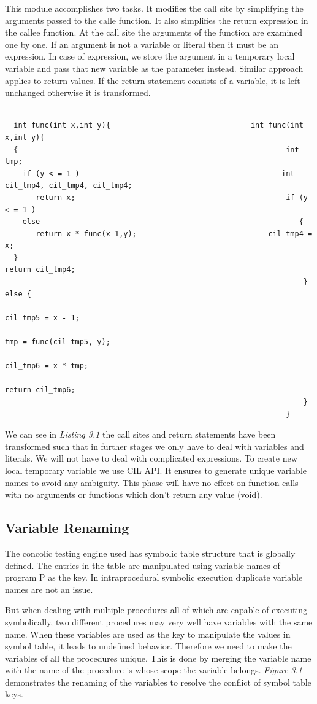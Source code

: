 \documentclass[12pt,oneside]{book}
\begin{document}
This module accomplishes two tasks. It modifies the call site by simplifying the arguments passed to the calle function. It also simplifies the return expression in the callee function. At the call site the arguments of the function are examined one by one. If an argument is not a variable or literal then it must be an expression. In case of expression, we store the argument in a temporary local variable and pass that new variable as the parameter instead. Similar approach applies to return values. If the return statement consists of a variable, it is left unchanged otherwise it is transformed.\\

\begin{lstlisting}[caption=Expressions simplified]

  int func(int x,int y){								int func(int x,int y){
  {																int tmp;
    if (y < = 1 )											   int cil_tmp4, cil_tmp4, cil_tmp4;
       return x;												if (y < = 1 )
    else														   {
       return x * func(x-1,y);							    cil_tmp4 = x;
  }																    return cil_tmp4;
     															    } else {
																       cil_tmp5 = x - 1;
																       tmp = func(cil_tmp5, y);
																       cil_tmp6 = x * tmp;
																       return cil_tmp6;
																    }
															    }

\end{lstlisting}


We can see in \textit{Listing 3.1} the call sites and return statements have been transformed such that in further stages we only have to deal with variables and literals. We will not have to deal with complicated expressions. To create new local temporary variable we use CIL API. It ensures to generate unique variable names to avoid any ambiguity.
This phase will have no effect on function calls with no arguments or functions which don't return any value (void).
\newpage

\subsection{Variable Renaming}
The concolic testing engine used has symbolic table structure that is globally defined. The entries in the table are manipulated using variable names of program P as the key. In intraprocedural symbolic execution duplicate variable names are not an issue.

But when dealing with multiple procedures all of which are capable of executing symbolically, two different procedures may very well have variables with the same name. When these variables are used as the key to manipulate the values in symbol table, it leads to undefined behavior. Therefore we need to make the variables of all the procedures unique. This is done by merging the variable name with the name of the procedure is whose scope the variable belongs. \textit{Figure 3.1} demonstrates the renaming of the variables to resolve the conflict of symbol table keys. \\
\end{document}
